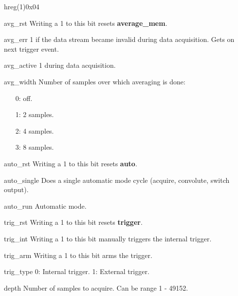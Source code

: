 \documentclass[11pt,technote,a4paper,onecolumn,dvips]{IEEEtran}
\newcommand{\module}[1]{{\ttfamily\bfseries #1}}
\begin{document}
\begin{register}{h}{reg(1)}{0x04}%
    \label{reg1}%
    \regnewline%
    \begin{regdesc}\begin{reglist}
        \item[avg\_rst] Writing a 1 to this bit resets \module{average\_mem}.
        \item[avg\_err] 1 if the data stream became invalid during data
            acquisition. Gets on next trigger event.
        \item[avg\_active] 1 during data acquisition.
        \item[avg\_width] Number of samples over which averaging is done:
            \begin{itemize}
                \item[0:] off.
                \item[1:] 2 samples.
                \item[2:] 4 samples.
                \item[3:] 8 samples.
            \end{itemize}
        \item[auto\_rst] Writing a 1 to this bit resets \module{auto}.
        \item[auto\_single] Does a single automatic mode cycle
            (acquire, convolute, switch output).
        \item[auto\_run] Automatic mode.
        \item[trig\_rst] Writing a 1 to this bit resets \module{trigger}. 
        \item[trig\_int] Writing a 1 to this bit manually triggers the
            internal trigger.
        \item[trig\_arm] Writing a 1 to this bit arms the trigger.
        \item[trig\_type] 0: Internal trigger. 1: External trigger.
        \item[depth] Number of samples to acquire. Can be range 1 - 49152.
    \end{reglist}\end{regdesc}
\end{register}
\end{document}
